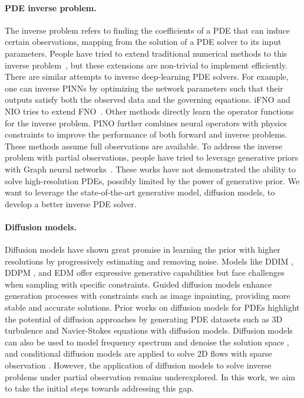 \vspace{-1.5em}\noindent
\paragraph{PDE inverse problem.}
The inverse problem refers to finding the coefficients of a PDE that can induce certain observations, mapping from the solution of a PDE solver to its input parameters.
People have tried to extend traditional numerical methods to this inverse problem~\cite{cho2017first,fox2001statistical,harrach2021introduction, kumar2023accelerating,van2015penalty}, but these extensions are non-trivial to implement efficiently.
There are similar attempts to inverse deep-learning PDE solvers.
For example, one can inverse PINNs by optimizing the network parameters such that their outputs satisfy both the observed data and the governing equations.
iFNO \cite{long2024invertible} and NIO \cite{molinaro2023neural} tries to extend FNO~\cite{li2020fourier}. 
Other methods \cite{de2022deep,pakravan2021solving} directly learn the operator functions for the inverse problem. 
PINO \cite{li2021physics} further combines neural operators with physics constraints to improve the performance of both forward and inverse problems.
These methods assume full observations are available.
To address the inverse problem with partial observations, people have tried to leverage generative priors with Graph neural networks~\cite{iakovlev2020learning, zhao2022learning}.
These works have not demonstrated the ability to solve high-resolution PDEs, possibly limited by the power of generative prior. 
We want to leverage the state-of-the-art generative model, diffusion models, to develop a better inverse PDE solver.

\vspace{-1.5em}\noindent
\paragraph{Diffusion models.}
Diffusion models have shown great promise in learning the prior with higher resolutions by progressively estimating and removing noise. 
Models like DDIM \cite{song2020denoising}, DDPM \cite{ho2020denoising}, and EDM \cite{Karras2022edm} offer expressive generative capabilities but face challenges when sampling with specific constraints. 
Guided diffusion models \cite{chung2022diffusion,chung2022improving,dhariwal2021diffusion,xu2023inversion} enhance generation processes with constraints such as image inpainting, providing more stable and accurate solutions. 
Prior works on diffusion models for PDEs highlight the potential of diffusion approaches by generating PDE datasets such as 3D turbulence \cite{jacobsen2023cocogen,lienen2023zero} and Navier-Stokes equations \cite{yang2023denoising} with diffusion models. Diffusion models can also be used to model frequency spectrum and denoise the solution space \cite{lippe2024pde}, and conditional diffusion models are applied to solve 2D flows with sparse observation \cite{shu2023physics}. However, the application of diffusion models to solve inverse problems under partial observation remains underexplored. In this work, we aim to take the initial steps towards addressing this gap.
